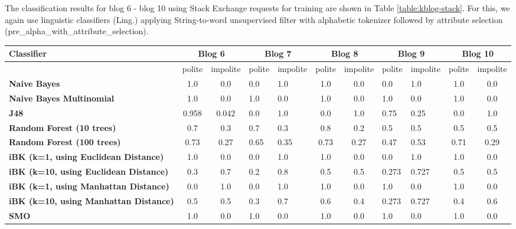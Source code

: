 \documentclass[conference]{IEEEtran}
\begin{document}
The classification results for blog 6 - blog 10 using Stack Exchange requests for training are shown in Table \ref{table:kblog-stack}. For this, we again use linguistic classifiers (Ling.) applying String-to-word unsupervised filter with alphabetic tokenizer followed by attribute selection (pre\_alpha\_with\_attribute\_selection). 

\begin{table*}[htbp]
\caption{Classification results using Stack Exchange requests for training for blog 6 - blog 10}
\centering
\vspace{5pt}
\begin{tabular}{|l|c|c|l|l|c|c|l|l|c|c|}
\hline
\textbf{Classifier} & \multicolumn{2}{|c|}{\textbf{Blog 6}} & \multicolumn{2}{|c|}{\textbf{Blog 7}} & \multicolumn{2}{|c|}{\textbf{Blog 8}} & \multicolumn{2}{|c|}{\textbf{Blog 9}} & \multicolumn{2}{|c|}{\textbf{Blog 10}} \\
\hline
& polite & impolite & polite & impolite & polite & impolite & polite & impolite & polite & impolite \\
\hline\hline
\textbf{Naive Bayes} & 1.0 & 0.0 & 0.0 & 1.0 & 1.0 & 0.0 & 0.0 & 1.0 & 1.0 & 0.0 \\ 
\hline
\textbf{Naive Bayes Multinomial} & 1.0 & 0.0 & 1.0 & 0.0 & 1.0 & 0.0 & 1.0 & 0.0 & 1.0 & 0.0 \\ 
\hline
\textbf{J48} & 0.958 & 0.042 & 0.0 & 1.0 & 0.0 & 1.0 & 0.75 & 0.25 & 0.0 & 1.0 \\ 
\hline
\textbf{Random Forest (10 trees)} & 0.7 & 0.3 & 0.7 & 0.3 & 0.8 & 0.2 & 0.5 & 0.5 & 0.5 & 0.5 \\ 
\hline
\textbf{Random Forest (100 trees)} & 0.73 & 0.27 & 0.65 & 0.35 & 0.73 & 0.27 & 0.47 & 0.53 & 0.71 & 0.29 \\ 
\hline
\textbf{iBK (k=1, using Euclidean Distance)} & 1.0 & 0.0 & 0.0 & 1.0 & 1.0 & 0.0 & 0.0 & 1.0 & 1.0 & 0.0 \\ 
\hline
\textbf{iBK (k=10, using Euclidean Distance)} & 0.3 & 0.7 & 0.2 & 0.8 & 0.5 & 0.5 & 0.273 & 0.727 & 0.5 & 0.5 \\ 
\hline
\textbf{iBK (k=1, using Manhattan Distance)} & 0.0 & 1.0 & 0.0 & 1.0 & 1.0 & 0.0 & 1.0 & 0.0 & 1.0 & 0.0 \\ 
\hline
\textbf{iBK (k=10, using Manhattan Distance)} & 0.5 & 0.5 & 0.3 & 0.7 & 0.6 & 0.4 & 0.273 & 0.727 & 0.4 & 0.6 \\ 
\hline
\textbf{SMO} & 1.0 & 0.0 & 1.0 & 0.0 & 1.0 & 0.0 & 1.0 & 0.0 & 1.0 & 0.0 \\ 
\hline
\hline
\end{tabular}
\label{table:kblog-stack}
\end{table*}
\end{document}

